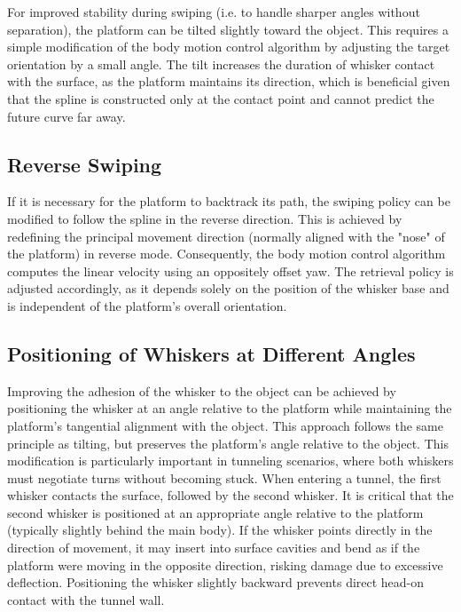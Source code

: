 For improved stability during swiping (i.e. to handle sharper angles without separation), the platform can be tilted slightly toward the object.
This requires a simple modification of the body motion control algorithm by adjusting the target orientation by a small angle.
The tilt increases the duration of whisker contact with the surface, as the platform maintains its direction, which is beneficial given that the spline is constructed only at the contact point and cannot predict the future curve far away.

\subsection{Reverse Swiping}

If it is necessary for the platform to backtrack its path, the swiping policy can be modified to follow the spline in the reverse direction.
This is achieved by redefining the principal movement direction (normally aligned with the "nose" of the platform) in reverse mode.
Consequently, the body motion control algorithm computes the linear velocity using an oppositely offset yaw.
The retrieval policy is adjusted accordingly, as it depends solely on the position of the whisker base and is independent of the platform's overall orientation.

\subsection{Positioning of Whiskers at Different Angles}

Improving the adhesion of the whisker to the object can be achieved by positioning the whisker at an angle relative to the platform while maintaining the platform's tangential alignment with the object.
This approach follows the same principle as tilting, but preserves the platform's angle relative to the object.
This modification is particularly important in tunneling scenarios, where both whiskers must negotiate turns without becoming stuck.
When entering a tunnel, the first whisker contacts the surface, followed by the second whisker.
It is critical that the second whisker is positioned at an appropriate angle relative to the platform (typically slightly behind the main body).
If the whisker points directly in the direction of movement, it may insert into surface cavities and bend as if the platform were moving in the opposite direction, risking damage due to excessive deflection.
Positioning the whisker slightly backward prevents direct head-on contact with the tunnel wall.

